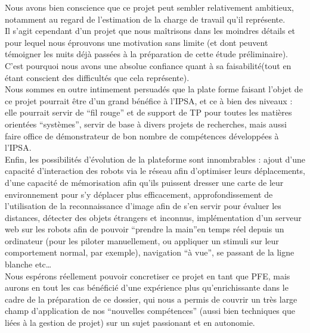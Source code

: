 Nous avons bien conscience que ce projet peut sembler relativement ambitieux, notamment au regard de l’estimation de la charge de travail qu’il représente.\\
Il s’agit cependant d’un projet que nous maîtrisons dans les moindres détails et pour lequel nous éprouvons une motivation sans limite (et dont peuvent témoigner les nuits déjà passées à la préparation de cette étude préliminaire). C’est pourquoi nous avons une absolue confiance quant à sa faisabilité(tout en étant conscient des difficultés que cela représente).\\

Nous sommes en outre intimement persuadés que la plate forme faisant l’objet de ce projet pourrait être d’un grand bénéfice à l’IPSA, et ce à bien des niveaux : elle pourrait servir de “fil rouge” et de support de TP pour toutes les matières orientées “systèmes”, servir de base à divers projets de recherches, mais aussi faire office de démonstrateur de bon nombre de compétences développées à l’IPSA.\\

Enfin, les possibilités d’évolution de la plateforme sont innombrables : ajout d’une capacité d’interaction des robots via le réseau afin d’optimiser leurs déplacements, d’une capacité de mémorisation afin qu’ils puissent dresser une carte de leur environnement pour s’y déplacer plus efficacement, approfondissement de l’utilisation de la reconnaissance d’image afin de s’en servir pour évaluer les distances, détecter des objets étrangers et inconnus, implémentation d’un serveur web sur les robots afin de pouvoir “prendre la main”en temps réel depuis un ordinateur (pour les piloter manuellement, ou appliquer un stimuli sur leur comportement normal, par exemple), navigation “à vue”, se passant de la ligne blanche etc…\\

Nous espérons réellement pouvoir concretiser ce projet en tant que PFE, mais aurons en tout les cas bénéficié d’une expérience plus qu’enrichissante dans le cadre de la préparation de ce dossier, qui nous a permis de couvrir un très large champ d’application de nos “nouvelles compétences” (aussi bien techniques que liées à la gestion de projet) sur un sujet passionant et en autonomie.